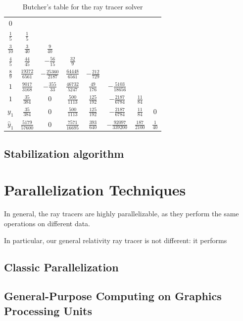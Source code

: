 \begin{table}[bth]
	\myfloatalign
	\begin{tabularx}{.9\textwidth}{c|ccccccc}
		$0$&  & & & & & & \\
		$\frac{1}{5}$&  $\frac{1}{5}$& & & & & & \\
		$\frac{3}{10}$&  $\frac{3}{40}$&  $\frac{9}{40}$& & & & & \\
		$\frac{4}{5}$&  $\frac{44}{45}$&  $-\frac{56}{15}$&  $\frac{32}{9}$& & & & \\
		$\frac{8}{9}$&  $\frac{19372}{6561}$&  $-\frac{25360}{2187}$&  $\frac{64448}{6561}$&  $-\frac{212}{729}$& & & \\
		$1$&  $\frac{9017}{3168}$&  $-\frac{355}{33}$&  $\frac{46732}{5247}$&  $\frac{49}{176}$&  $-\frac{5103}{18656}$& & \\
		$1$&  $\frac{35}{384}$&  $0$&  $\frac{500}{1113}$&  $\frac{125}{192}$&  $-\frac{2187}{6784}$&  $\frac{11}{84}$& \\ \hline
		$y_1$&  $\frac{35}{384}$&  $0$&  $\frac{500}{1113}$&  $\frac{125}{192}$&  $-\frac{2187}{6784}$&  $\frac{11}{84}$&  $0$ \\ \hline
		$\widehat{y}_1$&  $\frac{5179}{57600}$&  $0$&  $\frac{7571}{16695}$&  $\frac{393}{640}$&  $-\frac{92097}{339200}$&  $\frac{187}{2100}$&  $\frac{1}{40}$
	\end{tabularx}
	\caption{Butcher's table for the ray tracer solver}
	\label{tab:butcher}
\end{table}

\subsection{Stabilization algorithm}

\section{Parallelization Techniques}

In general, the ray tracers are highly parallelizable, as they perform the same operations on different data.

In particular, our general relativity ray tracer is not different: it performs

\subsection{Classic Parallelization}
\subsection{General-Purpose Computing on Graphics Processing Units}